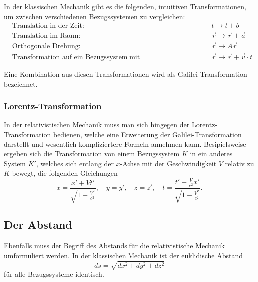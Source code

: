 In der klassischen Mechanik gibt es die folgenden,
intuitiven Transformationen, um zwischen verschiedenen Bezugssystemen
zu vergleichen:
\[
\begin{aligned}
    &\text{Translation in der Zeit: } && t \rightarrow t + b \\
    &\text{Translation im Raum: } && \vec{r} \rightarrow \vec{r} + \vec{a} \\
    &\text{Orthogonale Drehung: } && \vec{r} \rightarrow A \vec{r} \\
    &\text{Transformation auf ein Bezugssystem mit Relativgeschwindigkeit: } && \vec{r} \rightarrow \vec{r} + \vec{v} \cdot t
\end{aligned}
\]

Eine Kombination aus diesen Transformationen wird als Galilei-Transformation bezeichnet.

\subsubsection{Lorentz-Transformation 
\label{relativ:section:lorentz-trafo}}

In der relativistischen Mechanik muss man sich hingegen der Lorentz-Transformation bedienen,
welche eine Erweiterung der Galilei-Transformation darstellt
und wesentlich kompliziertere Formeln annehmen kann.
Besipielsweise ergeben sich die Transformation von einem
Bezugssystem \(K\) in ein anderes System \(K'\),
welches sich entlang der \(x\)-Achse mit der Geschwindigkeit \(V\)
relativ zu \(K\) bewegt, die folgenden Gleichungen
\begin{equation}
    x = \frac{x' + V t'}{\sqrt{1 - \frac{V^2}{c^2}}}, \quad
    y = y', \quad
    z = z', \quad
    t = \frac{t' + \frac{V}{c^2}x'}{\sqrt{1-\frac{V^2}{c^2}}}.
\end{equation}


\subsection{Der Abstand 
\label{relativ:section:abstand}}

Ebenfalls muss der Begriff des Abstands für die relativistische Mechanik umformuliert werden.
In der klassischen Mechanik ist der euklidische Abstand
\begin{equation}
    ds=\sqrt{dx^2 + dy^2 + dz^2}
\end{equation}
für alle Bezugssysteme identisch.

